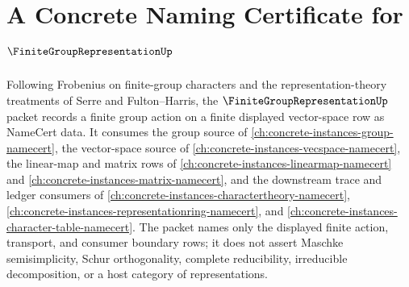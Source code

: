 \chapter{A Concrete Naming Certificate for $\FiniteGroupRepresentationUp$}
\label{ch:concrete-instances-finite-group-representation-namecert}

Following Frobenius on finite-group characters and the representation-theory treatments of Serre and Fulton--Harris, the $\FiniteGroupRepresentationUp$ packet records a finite group action on a finite displayed vector-space row as NameCert data. It consumes the group source of \autoref{ch:concrete-instances-group-namecert}, the vector-space source of \autoref{ch:concrete-instances-vecspace-namecert}, the linear-map and matrix rows of \autoref{ch:concrete-instances-linearmap-namecert} and \autoref{ch:concrete-instances-matrix-namecert}, and the downstream trace and ledger consumers of \autoref{ch:concrete-instances-charactertheory-namecert}, \autoref{ch:concrete-instances-representationring-namecert}, and \autoref{ch:concrete-instances-character-table-namecert}. The packet names only the displayed finite action, transport, and consumer boundary rows; it does not assert Maschke semisimplicity, Schur orthogonality, complete reducibility, irreducible decomposition, or a host category of representations.


